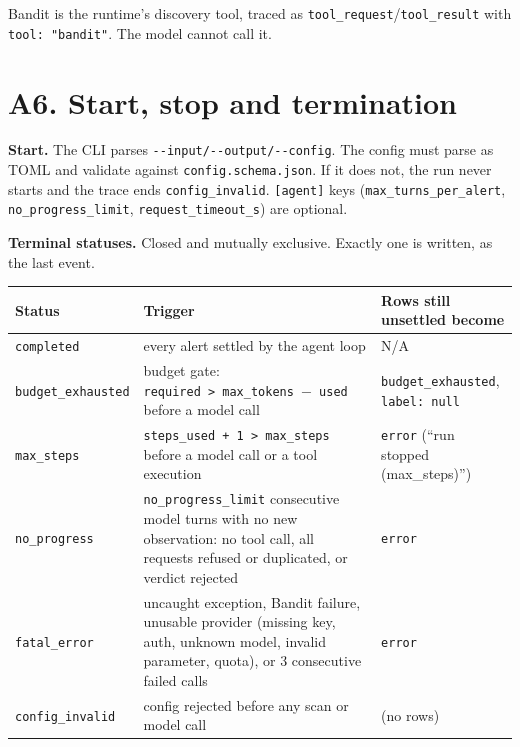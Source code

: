 \documentclass[
  10pt,
]{article}
\newcounter{none} %
\begin{document}
Bandit is the runtime's discovery tool, traced as
\texttt{tool\_request}/\texttt{tool\_result} with
\texttt{tool:\ "bandit"}. The model cannot call it.

\section{A6. Start, stop and
termination}\label{a6.-start-stop-and-termination}

\textbf{Start.} The CLI parses \texttt{-\/-input/-\/-output/-\/-config}.
The config must parse as TOML and validate against
\texttt{config.schema.json}. If it does not, the run never starts and
the trace ends \texttt{config\_invalid}. \texttt{{[}agent{]}} keys
(\texttt{max\_turns\_per\_alert}, \texttt{no\_progress\_limit},
\texttt{request\_timeout\_s}) are optional.

\textbf{Terminal statuses.} Closed and mutually exclusive. Exactly one
is written, as the last event.

{\def\LTcaptype{none} %
\begin{longtable}[]{@{}
  >{\raggedright\arraybackslash}p{}
  >{\raggedright\arraybackslash}p{}
  >{\raggedright\arraybackslash}p{}@{}}
\toprule\noalign{}
\begin{minipage}[b]{\linewidth}\raggedright
Status
\end{minipage} & \begin{minipage}[b]{\linewidth}\raggedright
Trigger
\end{minipage} & \begin{minipage}[b]{\linewidth}\raggedright
Rows still unsettled become
\end{minipage} \\
\midrule\noalign{}
\endhead
\bottomrule\noalign{}
\endlastfoot
\texttt{completed} & every alert settled by the agent loop & N/A \\
\texttt{budget\_exhausted} & budget gate:
\texttt{required\ \textgreater{}\ max\_tokens\ \ensuremath{-}\ used} before a model
call & \texttt{budget\_exhausted}, \texttt{label:\ null} \\
\texttt{max\_steps} &
\texttt{steps\_used\ +\ 1\ \textgreater{}\ max\_steps} before a model
call or a tool execution & \texttt{error} (``run stopped
(max\_steps)'') \\
\texttt{no\_progress} & \texttt{no\_progress\_limit} consecutive model
turns with no new observation: no tool call, all requests refused or
duplicated, or verdict rejected & \texttt{error} \\
\texttt{fatal\_error} & uncaught exception, Bandit failure, unusable
provider (missing key, auth, unknown model, invalid parameter, quota),
or 3 consecutive failed calls & \texttt{error} \\
\texttt{config\_invalid} & config rejected before any scan or model call
& (no rows) \\
\end{longtable}
}
\end{document}
